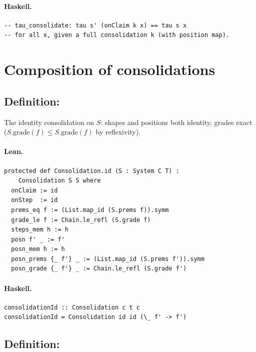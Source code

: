\documentclass[11pt,a4paper]{article}
\begin{document}
\paragraph{Haskell.}
\begin{lstlisting}[style=haskell]
-- tau_consolidate: tau s' (onClaim k x) == tau s x
-- for all x, given a full consolidation k (with position map).
\end{lstlisting}

\section{Composition of consolidations}

\subsection{Definition: }

\begin{defn}
The identity consolidation on $S$: shapes and positions both identity, grades
exact ($S.\mathrm{grade}(f) \le S.\mathrm{grade}(f)$ by reflexivity).
\end{defn}

\paragraph{Lean.}
\begin{lstlisting}[style=lean]
protected def Consolidation.id (S : System C T) :
    Consolidation S S where
  onClaim := id
  onStep  := id
  prems_eq f := (List.map_id (S.prems f)).symm
  grade_le f := Chain.le_refl (S.grade f)
  steps_mem h := h
  posn f' _ := f'
  posn_mem h := h
  posn_prems {_ f'} _ := (List.map_id (S.prems f')).symm
  posn_grade {_ f'} _ := Chain.le_refl (S.grade f')
\end{lstlisting}

\paragraph{Haskell.}
\begin{lstlisting}[style=haskell]
consolidationId :: Consolidation c t c
consolidationId = Consolidation id id (\_ f' -> f')
\end{lstlisting}


\subsection{Definition: }
\end{document}

